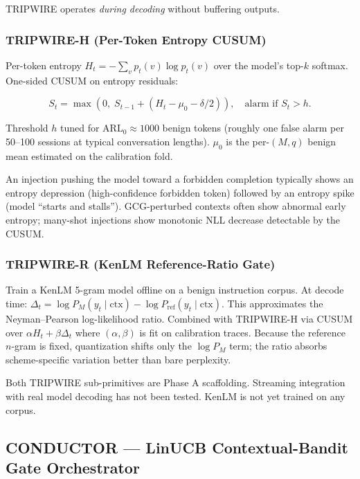\documentclass[11pt,a4paper]{article}
\begin{document}
TRIPWIRE operates \emph{during decoding} without buffering outputs.

\subsubsection*{TRIPWIRE-H (Per-Token Entropy CUSUM)}

Per-token entropy $H_t = -\sum_v p_t(v) \log p_t(v)$ over the model's top-$k$
softmax.
One-sided CUSUM on entropy residuals:

\begin{equation}
  S_t = \max\!\left(0,\; S_{t-1} + (H_t - \mu_0 - \delta/2)\right),
  \quad \text{alarm if } S_t > h.
  \label{eq:cusum}
\end{equation}

Threshold $h$ tuned for $\mathrm{ARL}_0 \approx 1000$ benign tokens
(roughly one false alarm per 50--100 sessions at typical conversation lengths).
$\mu_0$ is the per-$(M, q)$ benign mean estimated on the calibration fold.

An injection pushing the model toward a forbidden completion typically shows
an entropy depression (high-confidence forbidden token) followed by an entropy spike
(model ``starts and stalls'').
GCG-perturbed contexts often show abnormal early entropy; many-shot injections show
monotonic NLL decrease detectable by the CUSUM.

\subsubsection*{TRIPWIRE-R (KenLM Reference-Ratio Gate)}

Train a KenLM 5-gram model offline on a benign instruction corpus.
At decode time: $\Delta_t = \log P_M(y_t \mid \mathrm{ctx}) - \log P_\text{ref}(y_t \mid \mathrm{ctx})$.
This approximates the Neyman--Pearson log-likelihood ratio.
Combined with TRIPWIRE-H via CUSUM over $\alpha H_t + \beta \Delta_t$ where
$(\alpha, \beta)$ is fit on calibration traces.
Because the reference $n$-gram is fixed, quantization shifts only the $\log P_M$
term; the ratio absorbs scheme-specific variation better than bare perplexity.

\begin{scaffoldbox}
Both TRIPWIRE sub-primitives are Phase A scaffolding. Streaming integration with
real model decoding has not been tested. KenLM is not yet trained on any corpus.
\end{scaffoldbox}

\subsection{CONDUCTOR — LinUCB Contextual-Bandit Gate Orchestrator}
\end{document}
